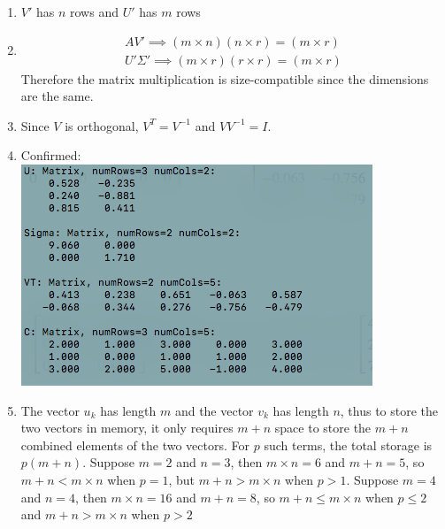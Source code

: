 \documentclass{article}
\begin{document}
\begin{enumerate}
\item $V'$ has $n$ rows and $U'$ has $m$ rows

\item 
\begin{eqnarray*}
AV' \implies (m \times n)(n \times r) = (m \times r)\\
U'\Sigma ' \implies (m \times r)(r \times r) = (m \times r)
\end{eqnarray*}
Therefore the matrix multiplication is size-compatible since the dimensions are the same.


\item Since $V$ is orthogonal, $V^T = V^{-1}$ and $VV^{-1} = I$. 

\item Confirmed: \\
\includegraphics[scale=0.6]{exercise7}

\item The vector $u_k$ has length $m$ and the vector $v_k$ has length $n$, thus to store the two vectors in memory, it only requires $m+n$ space to store the $m+n$ combined elements of the two vectors. For $p$ such terms, the total storage is $p(m+n)$. Suppose $m = 2$ and $n=3$, then $m \times n = 6$ and $m+n = 5$, so $m+n < m\times n$ when $p =1$, but $m+n>m\times n$ when $p > 1$. Suppose $m = 4$ and $n = 4$, then $m\times n = 16$ and $m+n = 8$, so $m+n \leq m\times n$ when $p \leq 2$ and $m+n > m\times n$ when $p > 2$


\end{enumerate}
\end{document}
